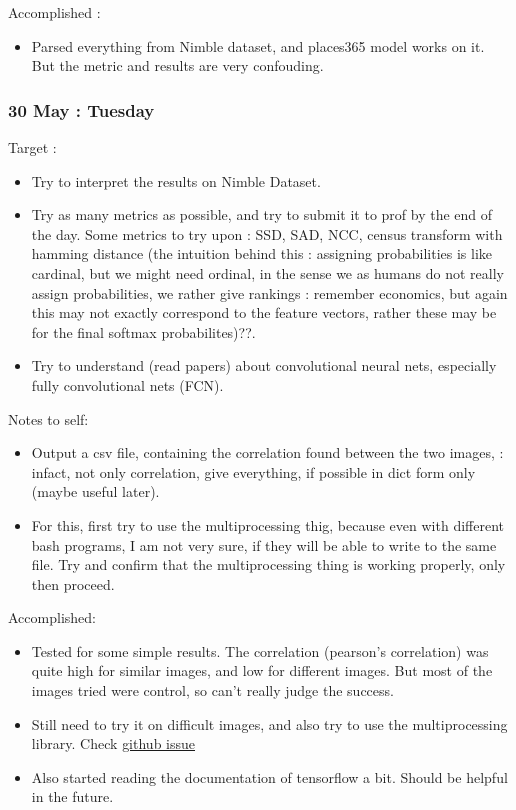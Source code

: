 \documentclass{article}
\begin{document}
Accomplished :
\begin{itemize}
\item Parsed everything from Nimble dataset, and places365 model works on it. But the metric and results are very confouding.
\end{itemize}

\subsubsection{30 May : Tuesday}
Target :
\begin{itemize}
\item Try to interpret the results on Nimble Dataset.
\item Try as many metrics as possible, and try to submit it to prof by the end of the day. Some metrics to try upon : SSD, SAD, NCC, census transform with hamming distance (the intuition behind this : assigning probabilities is like cardinal, but we might need ordinal, in the sense we as humans do not really assign probabilities, we rather give rankings : remember economics, but again this may not exactly correspond to the feature vectors, rather these may be for the final softmax probabilites)??.
\item Try to understand (read papers) about convolutional neural nets, especially fully convolutional nets (FCN).
\end{itemize}

Notes to self:
\begin{itemize}
\item Output a csv file, containing the correlation found between the two images, : infact, not only correlation, give everything, if possible in dict form only (maybe useful later).
\item For this, first try to use the multiprocessing thig, because even with different bash programs, I am not very sure, if they will be able to write to the same file. Try and confirm that the multiprocessing thing is working properly, only then proceed.
\end{itemize}

Accomplished:
\begin{itemize}
\item Tested for some simple results. The correlation (pearson's correlation) was quite high for similar images, and low for different images. But most of the images tried were control, so can't really judge the success.
\item Still need to try it on difficult images, and also try to use the multiprocessing library. Check \href{https://github.com/BVLC/caffe/issues/3607#issuecomment-305180367}{github issue}
\item Also started reading the documentation of tensorflow a bit. Should be helpful in the future.
\end{itemize}
\end{document}
